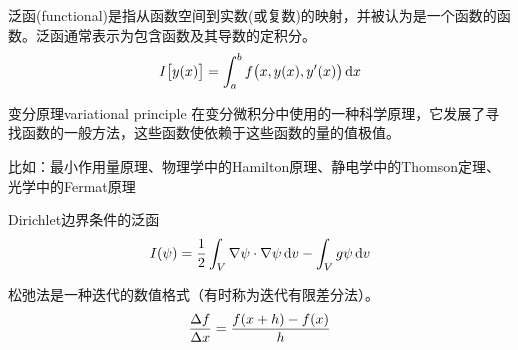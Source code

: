 
泛函(functional)是指从函数空间到实数(或复数)的映射，并被认为是一个函数的函数。泛函通常表示为包含函数及其导数的定积分。
\begin{align}
    I\bigl[y(x)\bigr]=\int_a^bf\bigl(x,y(x),y'(x)\bigr)\mathop{}\!\mathrm{d} x
\end{align}
\begin{definition}{变分原理}{variational principle}
    在变分微积分中使用的一种科学原理，它发展了寻找函数的一般方法，这些函数使依赖于这些函数的量的值极值。

    比如：最小作用量原理、物理学中的Hamilton原理、静电学中的Thomson定理、光学中的Fermat原理
\end{definition}
Dirichlet边界条件的泛函
\[
    I(\psi)=\frac12\int_V\nabla\psi\cdot\nabla\psi\mathop{}\!\mathrm{d} v-\int_Vg\psi\mathop{}\!\mathrm{d} v
\]


松弛法是一种迭代的数值格式（有时称为迭代有限差分法）。
\[
    \frac{\Delta f}{\Delta x}=\frac{f(x+h)-f(x)}h
\]

